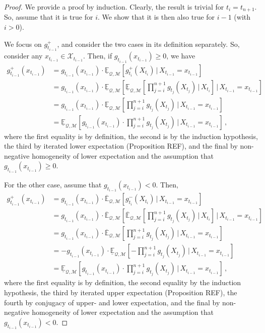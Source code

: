 \documentclass[twoside,11pt]{article}
\newcommand{\states}{\mathcal{X}}
\newcommand{\lexp}{\underline{\mathbb{E}}_{\rateset,\mathcal{M}}}
\newcommand{\uexp}{\overline{\mathbb{E}}_{\rateset,\mathcal{M}}}
\newcommand{\rateset}{\mathcal{Q}}
\begin{document}
\begin{proof}
We provide a proof by induction. Clearly, the result is trivial for $t_i=t_{n+1}$. So, assume that it is true for $i$. We show that it is then also true for $i-1$ (with $i>0$).

We focus on $g_{t_{i-1}}^+$, and consider the two cases in its definition separately. So, consider any $x_{t_{i-1}}\in\states_{t_{i-1}}$. Then, if $g_{t_{i-1}}(x_{t_{i-1}})\geq 0$, we have
\begin{align*}
g_{t_{i-1}}^+(x_{t_{i-1}}) &= g_{t_{i-1}}(x_{t_{i-1}})\cdot \lexp\left[g_{t_{i}}^+(X_{t_{i}})\,\vert\,X_{t_{i-1}}=x_{t_{i-1}}\right] \\
 &= g_{t_{i-1}}(x_{t_{i-1}})\cdot \lexp\left[\lexp\left[\prod_{j=i}^{n+1}g_{t_j}(X_{t_j})\,\vert\,X_{t_i}\right]\,\vert\,X_{t_{i-1}}=x_{t_{i-1}}\right] \\
 &= g_{t_{i-1}}(x_{t_{i-1}})\cdot \lexp\left[\prod_{j=i}^{n+1}g_{t_j}(X_{t_j})\,\vert\,X_{t_{i-1}}=x_{t_{i-1}}\right] \\ 
 &= \lexp\left[g_{t_{i-1}}(x_{t_{i-1}})\cdot\prod_{j=i}^{n+1}g_{t_j}(X_{t_j})\,\vert\,X_{t_{i-1}}=x_{t_{i-1}}\right]\,,
\end{align*}
where the first equality is by definition, the second is by the induction hypothesis, the third by iterated lower expectation (Proposition REF), and the final by non-negative homogeneity of lower expectation and the assumption that $g_{t_{i-1}}(x_{t_{i-1}})\geq 0$.

For the other case, assume that $g_{t_{i-1}}(x_{t_{i-1}})< 0$. Then,
\begin{align*}
g_{t_{i-1}}^+(x_{t_{i-1}}) &= g_{t_{i-1}}(x_{t_{i-1}})\cdot \uexp\left[g_{t_{i}}^-(X_{t_{i}})\,\vert\,X_{t_{i-1}}=x_{t_{i-1}}\right] \\
&= g_{t_{i-1}}(x_{t_{i-1}})\cdot \uexp\left[\uexp\left[\prod_{j=i}^{n+1}g_{t_j}(X_{t_j})\,\vert\,X_{t_i}\right]\,\vert\,X_{t_{i-1}}=x_{t_{i-1}}\right] \\
&= g_{t_{i-1}}(x_{t_{i-1}})\cdot \uexp\left[\prod_{j=i}^{n+1}g_{t_j}(X_{t_j})\,\vert\,X_{t_{i-1}}=x_{t_{i-1}}\right] \\
&= -g_{t_{i-1}}(x_{t_{i-1}})\cdot \lexp\left[-\prod_{j=i}^{n+1}g_{t_j}(X_{t_j})\,\vert\,X_{t_{i-1}}=x_{t_{i-1}}\right] \\
&= \lexp\left[g_{t_{i-1}}(x_{t_{i-1}})\cdot\prod_{j=i}^{n+1}g_{t_j}(X_{t_j})\,\vert\,X_{t_{i-1}}=x_{t_{i-1}}\right]\,,
\end{align*}
where the first equality is by definition, the second equality by the induction hypothesis, the third by iterated upper expectation (Proposition REF), the fourth by conjugacy of upper- and lower expectation, and the final by non-negative homogeneity of lower expectation and the assumption that $g_{t_{i-1}}(x_{t_{i-1}})<0$.


\end{proof}
\end{document}
